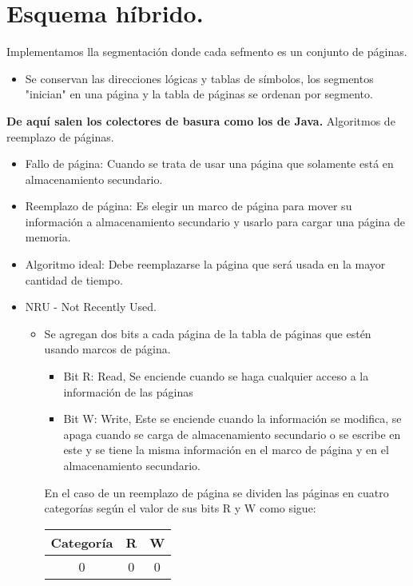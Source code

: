 \newpage
\chapter{Esquema h\'{i}brido.}
Implementamos lla segmentaci\'{o}n donde cada sefmento es un conjunto de p\'{a}ginas.
\begin{itemize}
	\item Se conservan las direcciones l\'{o}gicas y tablas de s\'{i}mbolos, los segmentos "inician" en una p\'{a}gina y la tabla de p\'{a}ginas se ordenan por segmento.
\end{itemize}
\textbf{De aqu\'{i} salen los colectores de basura como los de Java.}
Algoritmos de reemplazo de p\'{a}ginas.
\begin{itemize}
	\item Fallo de p\'{a}gina: Cuando se trata de usar una p\'{a}gina que solamente est\'{a} en almacenamiento secundario.
	\item Reemplazo de p\'{a}gina: Es elegir un marco de p\'{a}gina para mover su informaci\'{o}n a almacenamiento secundario y usarlo para cargar una p\'{a}gina de memoria.
	\item Algoritmo ideal: Debe reemplazarse la p\'{a}gina que ser\'{a} usada en la mayor cantidad de tiempo.
	\item NRU - Not Recently Used.
	\begin{itemize}
		\item Se agregan dos bits a cada p\'{a}gina de la tabla de p\'{a}ginas que est\'{e}n usando marcos de p\'{a}gina.
		\begin{itemize}
			\item Bit R: Read, Se enciende cuando se haga cualquier acceso a la informaci\'{o}n de las p\'{a}ginas
			\item Bit W: Write, Este se enciende cuando la informaci\'{o}n se modifica, se apaga cuando se carga de almacenamiento secundario o se escribe en este y se tiene la misma informaci\'{o}n en el marco de p\'{a}gina y en el almacenamiento secundario.
		\end{itemize}
			En el caso de un reemplazo de p\'{a}gina se dividen las p\'{a}ginas en cuatro categor\'{i}as seg\'{u}n el valor de sus bits R y W como sigue:\\
			\begin{center}
				\begin{tabular}{| c | c | c |}
					\hline
					Categor\'{i}a & R & W\\
					\hline
					\hline
					0 & 0 & 0 \\

\end{tabular}
\end{center}
\end{itemize}
\end{itemize}
